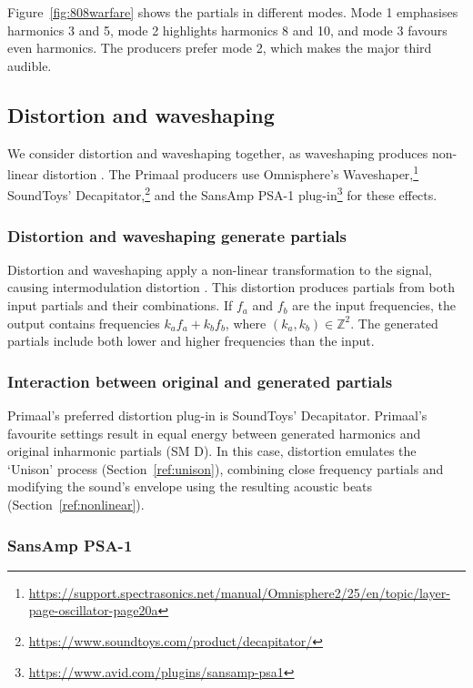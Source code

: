 \documentclass{article}
\begin{document}
Figure~\ref{fig:808warfare} shows the partials in different modes. Mode 1 emphasises harmonics 3 and 5, mode 2 highlights harmonics 8 and 10, and mode 3 favours even harmonics. The producers prefer mode 2, which makes the major third audible.

\subsection{Distortion and waveshaping}\label{ref:distortion}

We consider distortion and waveshaping together, as waveshaping produces non-linear distortion \citep{roads1979tutorial}. The Primaal producers use Omnisphere's Waveshaper,\footnote{\url{https://support.spectrasonics.net/manual/Omnisphere2/25/en/topic/layer-page-oscillator-page20a}} SoundToys' Decapitator,\footnote{\url{https://www.soundtoys.com/product/decapitator/}} and the SansAmp PSA-1 plug-in\footnote{\url{https://www.avid.com/plugins/sansamp-psa1}} for these effects.


\subsubsection{Distortion and waveshaping generate partials}\label{ref:waveshaping}

Distortion and waveshaping apply a non-linear transformation to the signal, causing intermodulation distortion \citep[p.~464]{newell2017recording}. This distortion produces partials from both input partials and their combinations. If $f_a$ and $f_b$ are the input frequencies, the output contains frequencies $k_a f_a + k_b f_b$, where $(k_a, k_b) \in \mathbb{Z}^2$. The generated partials include both lower and higher frequencies than the input.

\subsubsection{Interaction between original and generated partials}

Primaal's preferred distortion plug-in is SoundToys' Decapitator. Primaal's favourite settings result in equal energy between generated harmonics and original inharmonic partials (SM D).  In this case, distortion emulates the `Unison' process (Section~\ref{ref:unison}), combining close frequency partials and modifying the sound's envelope using the resulting acoustic beats (Section~\ref{ref:nonlinear}).

\subsubsection{SansAmp PSA-1}
\end{document}
